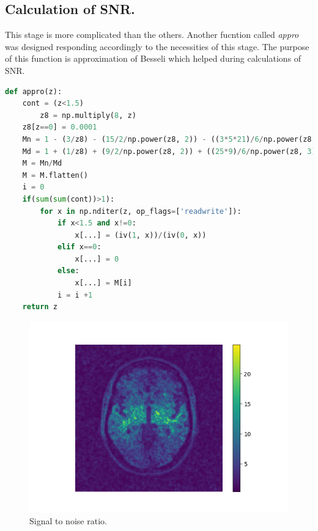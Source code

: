 \subsection*{Calculation of SNR.}
This stage is more complicated than the others. Another fucntion called \textit{appro} was designed responding accordingly to the necessities of this stage. The purpose of this function is approximation of Besseli which helped during calculations of SNR.
\begin{lstlisting}[language=Python, caption = Appro.]
def appro(z):
	cont = (z<1.5)
        z8 = np.multiply(8, z)
	z8[z==0] = 0.0001
	Mn = 1 - (3/z8) - (15/2/np.power(z8, 2)) - ((3*5*21)/6/np.power(z8, 3))
	Md = 1 + (1/z8) + (9/2/np.power(z8, 2)) + ((25*9)/6/np.power(z8, 3))
	M = Mn/Md
	M = M.flatten()
	i = 0
	if(sum(sum(cont))>1):
		for x in np.nditer(z, op_flags=['readwrite']):
			if x<1.5 and x!=0:
		        x[...] = (iv(1, x))/(iv(0, x))
		    elif x==0:
			    x[...] = 0
		    else:
			    x[...] = M[i]
		    i = i +1
	return z
\end{lstlisting}
\begin{figure}[H]
	\centering{}
		\includegraphics[scale=0.7]{figures/module03/70_snr}
	\caption{Signal to noise ratio.} 
\end{figure}
